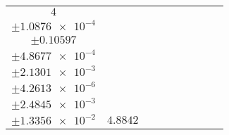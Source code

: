\documentclass[8pt]{article}
\begin{document}
\begin{longtable}[l]{c c c c c c c c c}
$\num{4}$ & \begin{tabular}[c]{@{}c@{}}$\num{6.5485e-2}$ \\ $\pm\num{1.0876e-4}$\end{tabular} & \begin{tabular}[c]{@{}c@{}}$\num{-1.4104}$ \\ $\pm\num{0.10597}$\end{tabular} & \begin{tabular}[c]{@{}c@{}}$\num{4.4468}$ \\ $\pm\num{4.8677e-4}$\end{tabular} & \begin{tabular}[c]{@{}c@{}}$\num{4.0493e+3}$ \\ $\pm\num{2.1301e-3}$\end{tabular} & \begin{tabular}[c]{@{}c@{}}$\num{8.1009}$ \\ $\pm\num{4.2613e-6}$\end{tabular} & \begin{tabular}[c]{@{}c@{}}$\num{1.6624}$ \\ $\pm\num{2.4845e-3}$\end{tabular} & \begin{tabular}[c]{@{}c@{}}$\num{4.5459}$ \\ $\pm\num{1.3356e-2}$\end{tabular} & $\num{4.8842}$\\
\bottomrule
\end{longtable}
\end{document}
